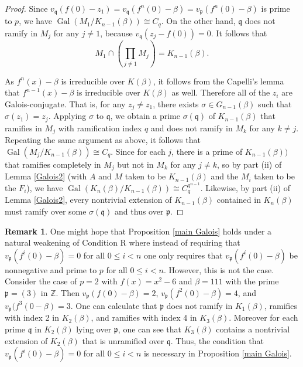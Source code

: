 \documentclass[11pt]{amsart}
\theoremstyle{definition}
\theoremstyle{definition}
\newtheorem{rem}[thm]{Remark}
\numberwithin{thm}{section}
\numberwithin{equation}{thm}
\newcommand{\bZ}{\ensuremath{{\mathbb{Z}}}}
\newcommand{\fp}{\ensuremath{{\mathfrak{p}}}}
\newcommand{\fq}{\ensuremath{{\mathfrak{q}}}}
\DeclareMathOperator{\Gal}{Gal}
\begin{document}
\begin{proof}
Since $v_\fq (f(0)-z_1) = v_\fq (f^n(0)-\beta)=v_\fp(f^n(0)-\beta)$
is prime to $p$, we have $\Gal(M_1/K_{n-1}(\beta)) \cong C_q$.
On the other hand, $\fq$ does not ramify in $M_j$ for any $j\ne 1$,
because $v_\fq (z_j-f(0))=0$. It follows that
\[M_1 \cap \left(\prod_{j\ne 1} M_j\right) = K_{n-1}(\beta).\]

As $f^n(x)-\beta$ is irreducible over $K(\beta)$, it follows from the
Capelli's lemma that $f^{n-1}(x)-\beta$ is irreducible over $K(\beta)$
as well. Therefore all of the $z_i$ are Galois-conjugate.  That is,
for any $z_j\neq z_1$, there exists $\sigma\in G_{n-1}(\beta)$ such
that $\sigma (z_1)=z_j$. Applying $\sigma$ to $\fq$, we obtain a prime
$\sigma(\fq)$ of $K_{n-1}(\beta)$ that ramifies in $M_j$ with
ramification index $q$ and does not ramify in $M_k$ for any $k\neq j$.
Repeating the same argument as above, it follows that
$\Gal(M_j/K_{n-1}(\beta))\cong C_q$. Since for each $j$, there is a
prime of $K_{n-1}(\beta))$ that ramifies completely in $M_j$ but not
in $M_k$ for any $j \ne k$, so by part (ii) of Lemma \ref{Galois2} (with $A$
and $M$ taken to be $K_{n-1}(\beta)$ and the $M_i$ taken to be the
$F_i$), we have
$\Gal(K_n(\beta)/K_{n-1}(\beta))\cong C_q^{q^{n-1}}$.  Likewise, by
part (ii) of Lemma \ref{Galois2}, every nontrivial extension of $K_{n-1}(\beta)$
contained in $K_n(\beta)$ must ramify over some $\sigma(\fq)$ and thus
over $\fp$.  


\end{proof}

\begin{rem}
  One might hope that Proposition \ref{main Galois} holds under a
  natural weakening of Condition R where instead of requiring that
  $v_\fp(f^i(0) - \beta) = 0$ for all $0 \leq i < n$ one only requires
  that $v_\fp(f^i(0) - \beta)$ be nonnegative and prime to $p$ for all
  $0 \leq i < n$.  However, this is not the case. Consider the case of
  $p=2$ with 
  $f(x) = x^2 -6$ and $\beta = 111$ with the prime $\fp = (3)$ in
  $\bZ$.  Then $v_\fp(f(0) - \beta) = 2$, $v_\fp(f^2(0) -\beta) = 4$,
  and $v_\fp(f^3(0 - \beta) = 3$. One can calculate that $\fp$ does
  not ramify in $K_1(\beta)$, ramifies with index 2 in $K_2(\beta)$,
  and ramifies with index 4 in $K_3(\beta)$.  Moreover for each prime
  $\fq$ in $K_2(\beta)$ lying over $\fp$, one can see that
  $K_3(\beta)$ contains a nontrivial extension of $K_2(\beta)$ that is
  unramified over $\fq$.  Thus, the condition that
  $v_\fp(f^i(0) - \beta) = 0$ for all $0 \leq i < n$ is necessary in
  Proposition \ref{main Galois}.
\end{rem}
\end{document}
